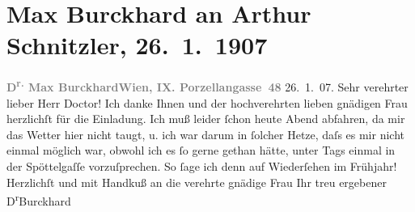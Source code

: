 

         
         \renewcommand{\erwaehntePersonen}{Personen: Max Eugen Burckhard, Olga Schnitzler}
         \renewcommand{\erwaehnteOrte}{Orte: Edmund-Weiß-Gasse 7, Porzellangasse, Wien}
         \renewcommand{\erwaehnteWerke}{}
               \section[Max Burckhard an Arthur Schnitzler, 26. 1. 1907]{ Max Burckhard an Arthur Schnitzler, 26. 1. 1907}\nopagebreak{}\rehead{ }\begin{ledgroupsized}[t]{13cm}\normalsize\beginnumbering \toendnotes[C]{\smallbreak\pagebreak[2]} 
\toendnotes[C]{\smallbreak}\pstart
           \noindent{}{\pb}\textcolor{gray}{\textbf{D\textsuperscript{r.} Max Burckhard}}\hfill \textcolor{gray}{\textbf{Wien, IX. Porzellangasse 48}}{ }26. 1. 07.\pend
           \pstart
           \raggedleft{}\textcolor{gray}{\textbf{}}\hspace*{3.5em}\pend
           \pstart{}Sehr verehrter lieber Herr Doctor!\pend\pstart
           Ich danke Ihnen und der hochverehrten lieben gnädigen Frau herzlichſt für die Einladung. Ich muß
               leider ſchon heute Abend abfahren, da mir das Wetter hier nicht taugt, u. ich war
               darum in ſolcher Hetze, daſs es mir nicht einmal möglich war, obwohl ich es ſo gerne
               gethan hätte, unter Tags einmal in der Spöttelgaſſe vorzuſprechen. So ſage ich denn auf Wiederſehen im Frühjahr!
               Herzlichſt und mit Handkuß an die verehrte gnädige Frau Ihr treu ergebener\pend
           \pstart \spacefill\mbox{D\textsuperscript{r}Burckhard}\pend{}
         
         \endnumbering{}\end{ledgroupsized}  \newcommand{\dateiname}{L01654}\newcommand{\titel}{Max Burckhard an Arthur Schnitzler, 26. 1. 1907}\newcommand{\editorInnen}{Martin Anton Müller und Gerd-Hermann Susen}
      